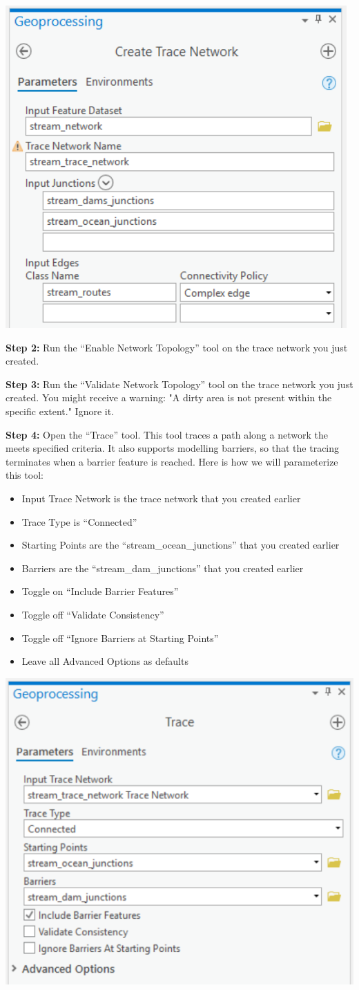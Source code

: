 \documentclass[
]{book}
\begin{document}
\includegraphics[width=0.5\linewidth]{images/02-create-trace-network}

\textbf{Step 2:} Run the ``Enable Network Topology'' tool on the trace network you just created.

\textbf{Step 3:} Run the ``Validate Network Topology'' tool on the trace network you just created. You might receive a warning: "A dirty area is not present within the specific extent." Ignore it.

\textbf{Step 4:} Open the ``Trace'' tool. This tool traces a path along a network the meets specified criteria. It also supports modelling barriers, so that the tracing terminates when a barrier feature is reached. Here is how we will parameterize this tool:

\begin{itemize}
\item
  Input Trace Network is the trace network that you created earlier
\item
  Trace Type is ``Connected''
\item
  Starting Points are the ``stream\_ocean\_junctions'' that you created earlier
\item
  Barriers are the ``stream\_dam\_junctions'' that you created earlier
\item
  Toggle on ``Include Barrier Features''
\item
  Toggle off ``Validate Consistency''
\item
  Toggle off ``Ignore Barriers at Starting Points''
\item
  Leave all Advanced Options as defaults
\end{itemize}

\includegraphics[width=0.5\linewidth]{images/02-trace}
\end{document}
